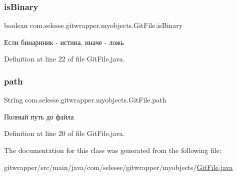 \subsubsection{\texorpdfstring{is\+Binary}{isBinary}}
{\footnotesize\ttfamily boolean com.\+selesse.\+gitwrapper.\+myobjects.\+Git\+File.\+is\+Binary\hspace{0.3cm}{\ttfamily [private]}}



Если бинариник -\/ истина, иначе -\/ ложь 



Definition at line 22 of file Git\+File.\+java.

\mbox{\label{classcom_1_1selesse_1_1gitwrapper_1_1myobjects_1_1_git_file_a2dd95a7e30e954c75cb4db8a36abcb0c}} 
\subsubsection{\texorpdfstring{path}{path}}
{\footnotesize\ttfamily String com.\+selesse.\+gitwrapper.\+myobjects.\+Git\+File.\+path\hspace{0.3cm}{\ttfamily [private]}}



Полный путь до файла 



Definition at line 20 of file Git\+File.\+java.



The documentation for this class was generated from the following file\+:\begin{DoxyCompactItemize}
\item 
gitwrapper/src/main/java/com/selesse/gitwrapper/myobjects/\hyperlink{_git_file_8java}{Git\+File.\+java}\end{DoxyCompactItemize}
